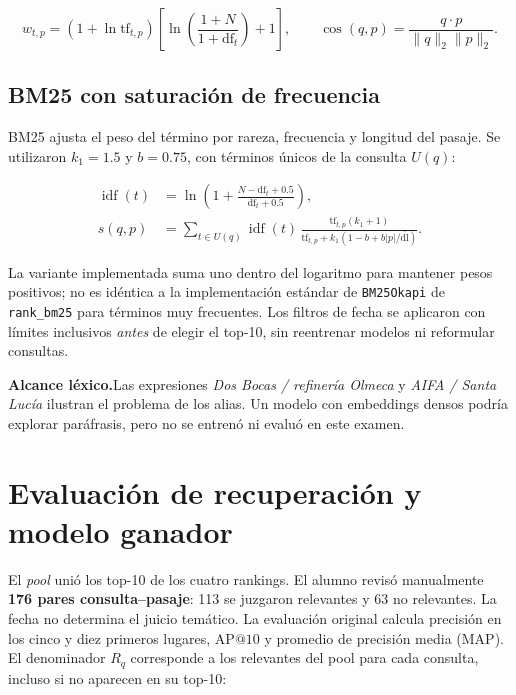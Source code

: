 \documentclass[10pt,a4paper]{article}
\newcommand{\notebox}[2]{\begin{tcolorbox}[colback=palewarm,colframe=palewarm,boxrule=0pt,arc=1mm,left=8pt,right=8pt,top=6pt,bottom=6pt,borderline west={2pt}{0pt}{ochre}]\textbf{#1}\enspace #2\end{tcolorbox}}
\begin{document}
\begin{equation}
w_{t,p}=(1+\ln\mathrm{tf}_{t,p})\left[\ln\left(\frac{1+N}{1+\mathrm{df}_t}\right)+1\right],
\qquad \operatorname{cos}(q,p)=\frac{q\cdot p}{\lVert q\rVert_2\lVert p\rVert_2}.
\end{equation}

\subsection{BM25 con saturación de frecuencia}
BM25 ajusta el peso del término por rareza, frecuencia y longitud del pasaje. Se utilizaron \(k_1=1.5\) y \(b=0.75\), con términos únicos de la consulta \(U(q)\):

\begin{align}
\operatorname{idf}(t)&=\ln\!\left(1+\frac{N-\mathrm{df}_t+0.5}{\mathrm{df}_t+0.5}\right),\\[-2pt]
s(q,p)&=\sum_{t\in U(q)}\operatorname{idf}(t)\,
\frac{\mathrm{tf}_{t,p}(k_1+1)}{\mathrm{tf}_{t,p}+k_1\left(1-b+b|p|/\overline{\mathrm{dl}}\right)}.
\end{align}

La variante implementada suma uno dentro del logaritmo para mantener pesos positivos; no es idéntica a la implementación estándar de \texttt{BM25Okapi} de \texttt{rank\_bm25} para términos muy frecuentes. Los filtros de fecha se aplicaron con límites inclusivos \emph{antes} de elegir el top-10, sin reentrenar modelos ni reformular consultas.

\notebox{Alcance léxico.}{Las expresiones \emph{Dos Bocas / refinería Olmeca} y \emph{AIFA / Santa Lucía} ilustran el problema de los alias. Un modelo con embeddings densos podría explorar paráfrasis, pero no se entrenó ni evaluó en este examen.}


\section{Evaluación de recuperación y modelo ganador}
El \emph{pool} unió los top-10 de los cuatro rankings. El alumno revisó manualmente \textbf{176 pares consulta--pasaje}: 113 se juzgaron relevantes y 63 no relevantes. La fecha no determina el juicio temático. La evaluación original calcula precisión en los cinco y diez primeros lugares, \(\mathrm{AP@10}\) y promedio de precisión media (MAP). El denominador \(R_q\) corresponde a los relevantes del pool para cada consulta, incluso si no aparecen en su top-10:
\end{document}

